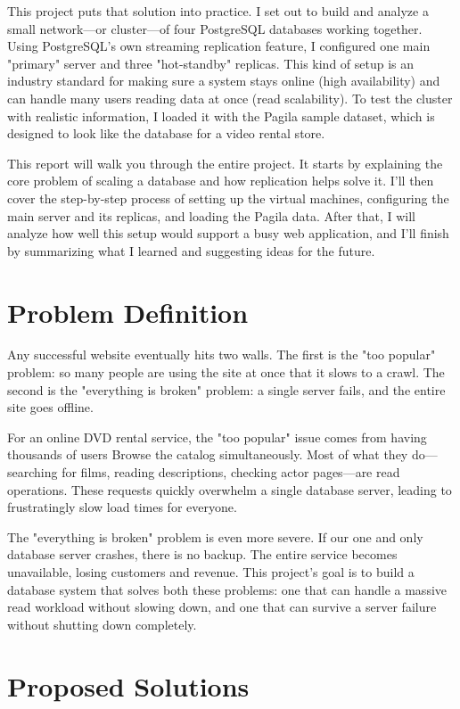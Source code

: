 \documentclass[conference]{IEEEtran}
\begin{document}
This project puts that solution into practice. I set out to build and analyze a small network—or cluster—of four PostgreSQL databases working together. Using PostgreSQL's own streaming replication feature, I configured one main "primary" server and three "hot-standby" replicas. This kind of setup is an industry standard for making sure a system stays online (high availability) and can handle many users reading data at once (read scalability). To test the cluster with realistic information, I loaded it with the Pagila sample dataset, which is designed to look like the database for a video rental store.

This report will walk you through the entire project. It starts by explaining the core problem of scaling a database and how replication helps solve it. I'll then cover the step-by-step process of setting up the virtual machines, configuring the main server and its replicas, and loading the Pagila data. After that, I will analyze how well this setup would support a busy web application, and I'll finish by summarizing what I learned and suggesting ideas for the future.
\section{Problem Definition}
Any successful website eventually hits two walls. The first is the "too popular" problem: so many people are using the site at once that it slows to a crawl. The second is the "everything is broken" problem: a single server fails, and the entire site goes offline.

For an online DVD rental service, the "too popular" issue comes from having thousands of users Browse the catalog simultaneously. Most of what they do—searching for films, reading descriptions, checking actor pages—are read operations. These requests quickly overwhelm a single database server, leading to frustratingly slow load times for everyone.

The "everything is broken" problem is even more severe. If our one and only database server crashes, there is no backup. The entire service becomes unavailable, losing customers and revenue. This project's goal is to build a database system that solves both these problems: one that can handle a massive read workload without slowing down, and one that can survive a server failure without shutting down completely.

\section{Proposed Solutions}
\end{document}
